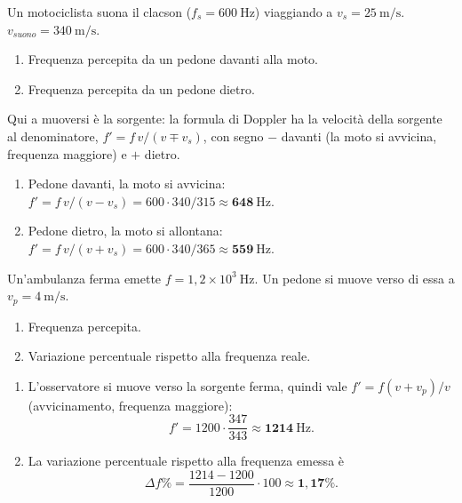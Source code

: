 \begin{question}[ID=3.2, subtitle={Motociclista che si avvicina a un semaforo}, tags={effetto doppler, suono}, difficulty=media]
Un motociclista suona il clacson ($f_s = 600\ \mathrm{Hz}$) viaggiando a $v_s = 25\ \mathrm{m/s}$. $v_{suono} = 340\ \mathrm{m/s}$.
\begin{enumerate}
\item Frequenza percepita da un pedone davanti alla moto.
\item Frequenza percepita da un pedone dietro.
\end{enumerate}
\begin{solution}
Qui a muoversi è la sorgente: la formula di Doppler ha la velocità della sorgente al denominatore, $f' = f\,v/(v \mp v_s)$, con segno $-$ davanti (la moto si avvicina, frequenza maggiore) e $+$ dietro.
\begin{enumerate}
\item Pedone davanti, la moto si avvicina: $f' = f\,v/(v-v_s) = 600\cdot 340/315 \approx \mathbf{648\ \mathrm{Hz}}$.
\item Pedone dietro, la moto si allontana: $f' = f\,v/(v+v_s) = 600\cdot 340/365 \approx \mathbf{559\ \mathrm{Hz}}$.
\end{enumerate}
\end{solution}
\end{question}

\begin{question}[ID=3.3, subtitle={Pedone che si avvicina a ambulanza ferma}, tags={doppler inverso}, difficulty=media]
Un'ambulanza ferma emette $f = 1{,}2\times10^3\ \mathrm{Hz}$. Un pedone si muove verso di essa a $v_p = 4\ \mathrm{m/s}$.
\begin{enumerate}
\item Frequenza percepita.
\item Variazione percentuale rispetto alla frequenza reale.
\end{enumerate}
\begin{solution}
\begin{enumerate}
\item L'osservatore si muove verso la sorgente ferma, quindi vale $f' = f(v+v_p)/v$ (avvicinamento, frequenza maggiore):
\[
f' = 1200\cdot\frac{347}{343} \approx \mathbf{1214\ \mathrm{Hz}}.
\]
\item La variazione percentuale rispetto alla frequenza emessa è
\[
\Delta f\% = \frac{1214-1200}{1200}\cdot 100 \approx \mathbf{1{,}17\%}.
\]
\end{enumerate}
\end{solution}
\end{question}

